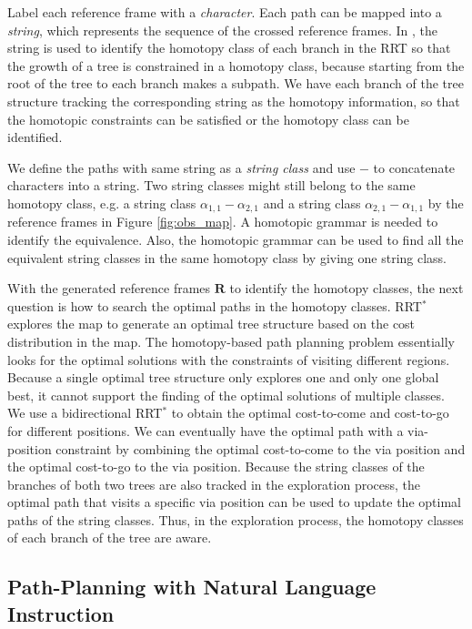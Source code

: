 \documentclass[phd]{byuprop}
\begin{document}
Label each reference frame with a \emph{character}.
Each path can be mapped into a {\em string}, which represents the sequence of the crossed reference frames.
In \cite{Hernandez2015}, the string is used to identify the homotopy class of each branch in the RRT so that the growth of a tree is constrained in a homotopy class, because starting from the root of the tree to each branch makes a subpath.
We have each branch of the tree structure tracking the corresponding string as the homotopy information, so that the homotopic constraints can be satisfied or the homotopy class can be identified.

We define the paths with same string as a \emph{string class} and use $ - $ to concatenate characters into a string.
Two string classes might still belong to the same homotopy class, e.g. a string class $ \alpha_{1,1}-\alpha_{2,1} $ and a string class $ \alpha_{2,1}-\alpha_{1,1} $ by the reference frames in Figure \ref{fig:obs_map}.
A homotopic grammar is needed to identify the equivalence.
Also, the homotopic grammar can be used to find all the equivalent string classes in the same homotopy class by giving one string class.

With the generated reference frames $ \mathbf{R} $ to identify the homotopy classes, the next question is how to search the optimal paths in the homotopy classes.
RRT$^{*}$ explores the map to generate an optimal tree structure based on the cost distribution in the map.
The homotopy-based path planning problem essentially looks for the optimal solutions with the constraints of visiting different regions.
Because a single optimal tree structure only explores one and only one global best, it cannot support the finding of the optimal solutions of multiple classes.
We use a bidirectional RRT$^{*}$ to obtain the optimal cost-to-come and cost-to-go for different positions.
We can eventually have the optimal path with a via-position constraint by combining the optimal cost-to-come to the via position and the optimal cost-to-go to the via position.
Because the string classes of the branches of both two trees are also tracked in the exploration process, the optimal path that visits a specific via position can be used to update the optimal paths of the string classes. 
Thus, in the exploration process, the homotopy classes of each branch of the tree are aware.

\subsection{Path-Planning with Natural Language Instruction}
\end{document}
